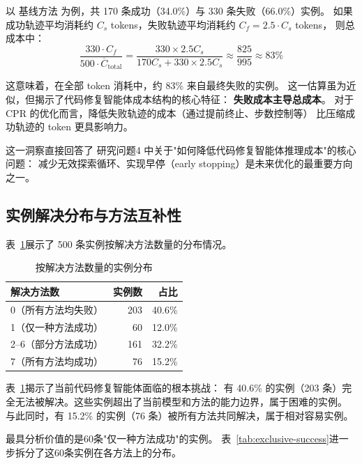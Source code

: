 以 基线方法 为例，共 170 条成功（34.0\%）与 330 条失败（66.0\%）实例。
如果成功轨迹平均消耗约 $C_s$ tokens，失败轨迹平均消耗约 $C_f = 2.5 \cdot C_s$ tokens，
则总成本中：
\begin{equation}
  \frac{330 \cdot C_f}{500 \cdot \overline{C}_{\text{total}}}
  = \frac{330 \times 2.5 C_s}{170 C_s + 330 \times 2.5 C_s}
  \approx \frac{825}{995} \approx 83\%
  \label{eq:failure-cost-ratio}
\end{equation}

这意味着，在全部 token 消耗中，约 83\% 来自最终失败的实例。
这一估算虽为近似，但揭示了代码修复智能体成本结构的核心特征：
\textbf{失败成本主导总成本}。
对于 CPR 的优化而言，降低失败轨迹的成本（通过提前终止、步数控制等）
比压缩成功轨迹的 token 更具影响力。

这一洞察直接回答了 研究问题4 中关于"如何降低代码修复智能体推理成本"的核心问题：
减少无效探索循环、实现早停（early stopping）是未来优化的最重要方向之一。

\subsection{实例解决分布与方法互补性}
\label{subsec:solve-distribution}

表~\ref{tab:solve-distribution}展示了 500 条实例按解决方法数量的分布情况。

\begin{table}[htbp]
  \centering
  \caption{按解决方法数量的实例分布}
  \label{tab:solve-distribution}
  \begin{tabular}{lrr}
    \toprule
    解决方法数 & 实例数 & 占比 \\
    \midrule
    0（所有方法均失败） & 203 & 40.6\% \\
    1（仅一种方法成功） & 60  & 12.0\% \\
    2–6（部分方法成功） & 161 & 32.2\% \\
    7（所有方法均成功） & 76  & 15.2\% \\
    \bottomrule
  \end{tabular}
\end{table}

表~\ref{tab:solve-distribution}揭示了当前代码修复智能体面临的根本挑战：
有 40.6\% 的实例（203 条）完全无法被解决。这些实例超出了当前模型和方法的能力边界，属于困难的实例。
与此同时，有 15.2\% 的实例（76 条）被所有方法共同解决，属于相对容易实例。

最具分析价值的是60条"仅一种方法成功"的实例。
表~\ref{tab:exclusive-success}进一步拆分了这60条实例在各方法上的分布。


